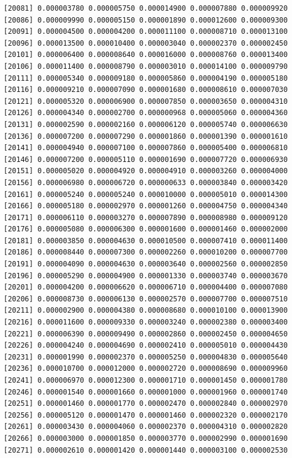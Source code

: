 \documentclass[]{article}
\begin{document}
\begin{verbatim}
[20081] 0.000003780 0.000005750 0.000014900 0.000007880 0.000009920
[20086] 0.000009990 0.000005150 0.000001890 0.000012600 0.000009300
[20091] 0.000004500 0.000004200 0.000011100 0.000008710 0.000013100
[20096] 0.000013500 0.000010400 0.000003040 0.000002370 0.000002450
[20101] 0.000006400 0.000008640 0.000016000 0.000008760 0.000013400
[20106] 0.000011400 0.000008790 0.000003010 0.000014100 0.000009790
[20111] 0.000005340 0.000009180 0.000005860 0.000004190 0.000005180
[20116] 0.000009210 0.000007090 0.000001680 0.000008610 0.000007030
[20121] 0.000005320 0.000006900 0.000007850 0.000003650 0.000004310
[20126] 0.000004340 0.000002700 0.000000968 0.000005060 0.000004360
[20131] 0.000002590 0.000002160 0.000006120 0.000005740 0.000006630
[20136] 0.000007200 0.000007290 0.000001860 0.000001390 0.000001610
[20141] 0.000004940 0.000007100 0.000007860 0.000005400 0.000006810
[20146] 0.000007200 0.000005110 0.000001690 0.000007720 0.000006930
[20151] 0.000005020 0.000004920 0.000004910 0.000003260 0.000004000
[20156] 0.000006980 0.000006720 0.000000633 0.000003840 0.000003420
[20161] 0.000005240 0.000005240 0.000010000 0.000005010 0.000014300
[20166] 0.000005180 0.000002970 0.000001260 0.000004750 0.000004340
[20171] 0.000006110 0.000003270 0.000007890 0.000008980 0.000009120
[20176] 0.000005080 0.000006300 0.000001600 0.000001460 0.000002000
[20181] 0.000003850 0.000004630 0.000010500 0.000007410 0.000011400
[20186] 0.000008440 0.000007300 0.000002260 0.000010200 0.000007700
[20191] 0.000004090 0.000004630 0.000003640 0.000002560 0.000002850
[20196] 0.000005290 0.000004900 0.000001330 0.000003740 0.000003670
[20201] 0.000004200 0.000006620 0.000006710 0.000004400 0.000007080
[20206] 0.000008730 0.000006130 0.000002570 0.000007700 0.000007510
[20211] 0.000002900 0.000004380 0.000008680 0.000010100 0.000013900
[20216] 0.000011600 0.000009330 0.000003240 0.000002380 0.000003400
[20221] 0.000006390 0.000009490 0.000002860 0.000002450 0.000004650
[20226] 0.000004240 0.000004690 0.000002410 0.000005010 0.000004430
[20231] 0.000001990 0.000002370 0.000005250 0.000004830 0.000005640
[20236] 0.000010700 0.000012000 0.000002720 0.000008690 0.000009960
[20241] 0.000006970 0.000012300 0.000001710 0.000001450 0.000001780
[20246] 0.000001540 0.000001660 0.000001000 0.000001960 0.000001740
[20251] 0.000001460 0.000001770 0.000002470 0.000002840 0.000002970
[20256] 0.000005120 0.000001470 0.000001460 0.000002320 0.000002170
[20261] 0.000003430 0.000004060 0.000002370 0.000004310 0.000002820
[20266] 0.000003000 0.000001850 0.000003770 0.000002990 0.000001690
[20271] 0.000002610 0.000001420 0.000001440 0.000003100 0.000002530

\end{verbatim}
\end{document}
